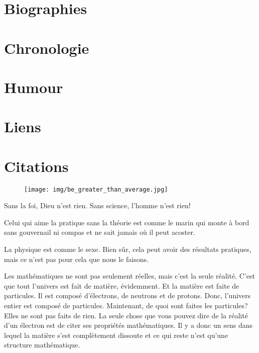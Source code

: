 \documentclass[12pt,a4paper,twoside,openright]{report}
\theoremstyle{definition}
\theoremstyle{itexmp}
\numberwithin{equation}{section}
\begin{document}
	\chapter{Biographies}
	

	\chapter{Chronologie}
	

	\chapter{Humour}
	\minitoc
	\pagebreak
	

 	\chapter{Liens}
	

			
	\chapter{Citations}
	\begin{figure}[H]
		\centering
		\texttt{[image: img/be\_greater\_than\_average.jpg]}	
	\end{figure}
	\begin{fquote}Sans la foi, Dieu n'est rien. Sans science, l'homme n'est rien!
 	\end{fquote}
 	
	\begin{fquote}Celui qui aime la pratique sans la théorie est comme le marin qui monte à bord sans gouvernail ni compas et ne sait jamais où il peut acoster.
 	\end{fquote}
 	
	\begin{fquote}La physique est comme le sexe. Bien sûr, cela peut avoir des résultats pratiques, mais ce n’est pas pour cela que nous le faisons.
 	\end{fquote}
 	
	\begin{fquote}Les mathématiques ne sont pas seulement réelles, mais c'est la seule réalité. C'est que tout l'univers est fait de matière, évidemment. Et la matière est faite de particules. Il est composé d'électrons, de neutrons et de protons. Donc, l'univers entier est composé de particules. Maintenant, de quoi sont faites les particules? Elles ne sont pas faits de rien. La seule chose que vous pouvez dire de la réalité d'un électron est de citer ses propriétés mathématiques. Il y a donc un sens dans lequel la matière s'est complètement dissoute et ce qui reste n'est qu'une structure mathématique.
 	\end{fquote}
 	
\end{document}
